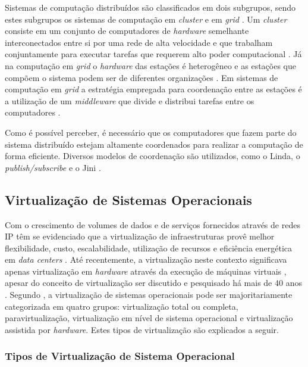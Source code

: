 Sistemas de computação distribuídos são classificados em dois subgrupos, sendo estes subgrupos os sistemas de computação em \textit{cluster} e em \textit{grid} \cite{tanenbaum}. Um \textit{cluster} consiste em um conjunto de computadores de \textit{hardware} semelhante interconectados entre si por uma rede de alta velocidade e que trabalham conjuntamente para executar tarefas que requerem alto poder computacional \cite{cluster&grid}. Já na computação em \textit{grid} o \textit{hardware} das estações é heterogêneo e as estações que compõem o sistema podem ser de diferentes organizações \cite{tanenbaum}. Em sistemas de computação em \textit{grid} a estratégia empregada para coordenação entre as estações é a utilização de um \textit{middleware} que divide e distribui tarefas entre os computadores \cite{cluster&grid}.

Como é possível perceber, é necessário que os computadores que fazem parte do sistema distribuído estejam altamente coordenados para realizar a computação de forma eficiente. Diversos modelos de coordenação são utilizados, como o Linda, o \textit{publish/subscribe} e o Jini \cite{tanenbaum2}. 

\subsection{Virtualização de Sistemas Operacionais}

Com o crescimento de volumes de dados e de serviços fornecidos através de redes \ac{IP} têm se evidenciado que a virtualização de infraestruturas provê melhor flexibilidade, custo, escalabilidade, utilização de recursos e eficiência energética em \textit{data centers} \cite{bari}. Até recentemente, a virtualização neste contexto significava apenas virtualização em \textit{hardware} através da execução de máquinas virtuais \cite{tay}, apesar do conceito de virtualização ser discutido e pesquisado há mais de 40 anos \cite{pearce}. Segundo , a virtualização de sistemas operacionais pode ser majoritariamente categorizada em quatro grupos: virtualização total ou completa,  paravirtualização, virtualização em nível de sistema operacional e virtualização assistida por \textit{hardware}. Estes tipos de virtualização são explicados a seguir.

\subsubsection{Tipos de Virtualização de Sistema Operacional}

